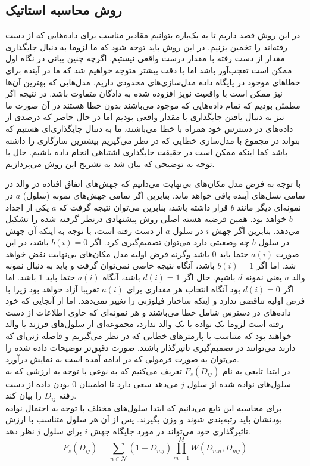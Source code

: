 \subsection{روش محاسبه استاتیک}
در این روش قصد داریم تا به یک‌باره بتوانیم مقادیر مناسب برای داده‌هایی که از دست رفته‌اند را تخمین بزنیم. در این روش باید توجه شود که ما لزوما به دنبال جایگذاری مقدار از دست رفته با مقدار درست واقعی نیستیم. اگرچه چنین بیانی در نگاه اول ممکن است تعجب‌آور باشد اما با دقت بیشتر متوجه خواهیم شد که ما در آینده برای خطاهای موجود در پایگاه داده مدل‌سازی‌های محدودی داریم. مدل‌هایی که بهترین آن‌ها نیز ممکن است با واقعیت نویز افزوده شده به دادگان متفاوت باشد. در نتیجه اگر مطمئن بودیم که تمام داده‌هایی که موجود می‌باشند بدون خطا هستند در آن صورت ما نیز به دنبال یافتن جایگذاری با مقدار واقعی بودیم اما در حال حاضر که درصدی از داده‌های در دسترس خود همراه با خطا می‌باشند، ما به دنبال جایگذاری‌ای هستیم که بتواند در مجموع با مدل‌سازی خطایی که در نظر می‌گیریم بیشترین سازگاری را داشته باشد کما اینکه ممکن است در حقیقت جایگذاری اشتباهی انجام داده باشیم. حال با توجه به توضیحی که بیان شد به تشریح این روش می‌پردازیم.

با توجه به فرض مدل مکان‌های بی‌نهایت می‌دانیم که جهش‌های اتفاق افتاده در والد در تمامی نسل‌های آینده باقی خواهد ماند. بنابرین اگر تمامی جهش‌های نمونه (سلول) $a$ در نمونه‌ای دیگر مانند $b$ قرار داشته باشد، بنابرین می‌توان نتیجه گرفت که $a$ یکی از اجداد $b$ خواهد بود. همین فرضیه هسته اصلی روش پیشنهادی درنظر گرفته شده را تشکیل می‌دهد. بنابرین اگر جهش $i$ در سلول $a$ از دست رفته است، با توجه به اینکه آن جهش در سلول $b$ چه وضعیتی دارد می‌توان تصمیم‌گیری کرد. اگر $b(i)=0$ باشد، در این صورت $a(i)$ حتما باید $0$ باشد وگرنه فرض اولیه مدل مکان‌های بی‌نهایت نقض خواهد شد. اما اگر $b(i)=1$ باشد، آنگاه نتیجه خاصی نمی‌توان گرفت و باید به دنبال نمونه والد $a$ یعنی نمونه $d$ باشیم. حال اگر $d(i)=1$ باشد، آنگاه $a(i)$ حتما باید $1$ باشد. اما اگر $d(i)=0$ بود آنگاه انتخاب هر مقداری برای $a(i)$ تقریبا آزاد خواهد بود زیرا با فرض اولیه تناقضی ندارد و اینکه ساختار فیلوژنی را تغییر نمی‌دهد. اما از آنجایی که  خود داده‌های در دسترس شامل خطا می‌باشند و هر نمونه‌ای که حاوی اطلاعات از دست رفته است لزوما یک نواده یا یک والد ندارد، مجموعه‌ای از سلول‌های فرزند یا والد خواهند بود که متناسب با پارمترهای خطایی که در نظر می‌گیریم و فاصله ژنی‌ای که دارند می‌توانند در تصمیم‌گیری تاثیرگذار باشند. صورت دقیق‌تر توضیحات داده شده را می‌توان به صورت فرمولی که در ادامه آمده است به نمایش درآورد.
\\
در ابتدا تابعی به نام $F_s(D_{ij})$ تعریف می‌کنیم که به نوعی با توجه به ارزشی که به سلول‌های نواده شده از سلول $j$ می‌دهد سعی دارد تا اطمینان $0$ بودن داده از دست رفته $D_{ij}$ را بیان کند.
\\
برای محاسبه این تابع می‌دانیم که ابتدا سلول‌های مختلف با توجه به احتمال نواده بودنشان باید رتبه‌بندی شوند و وزن بگیرند. پس از آن  هر سلول متناسب با ارزش تاثیرگذاری خود می‌تواند در مورد جایگاه جهش $i$ برای سلول $j$ نظر دهد.
\begin{equation}
	F_s(D_{ij}) = \sum_{n \in \mathcal{N}}  (1-D_{mj})  \prod_{m=1}^{M} W(D_{mn}, D_{mj})
	\label{eq:ch_pm:F_s_simple}
\end{equation}

